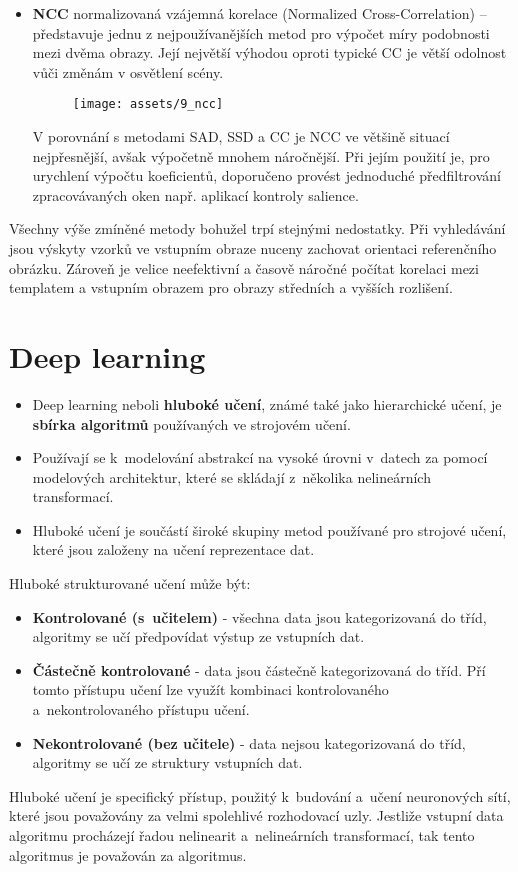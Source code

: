 \begin{itemize}
    \item \textbf{NCC} normalizovaná vzájemná korelace (Normalized Cross-Correlation) -- představuje jednu z nejpoužívanějších metod pro výpočet míry podobnosti mezi dvěma obrazy. Její největší výhodou oproti typické CC je větší odolnost vůči změnám v osvětlení scény.
          \begin{figure}[H]
              \centering
              \texttt{[image: assets/9\_ncc]}
          \end{figure}
          V porovnání s metodami SAD, SSD a CC je NCC ve většině situací nejpřesnější, avšak výpočetně mnohem náročnější. Při jejím použití je, pro urychlení výpočtu koeficientů, doporučeno provést jednoduché předfiltrování zpracovávaných oken např. aplikací kontroly salience.
\end{itemize}

Všechny výše zmíněné metody bohužel trpí stejnými nedostatky. Při vyhledávání jsou výskyty vzorků ve vstupním obraze nuceny zachovat orientaci referenčního obrázku. Zároveň je velice neefektivní a časově náročné počítat korelaci mezi templatem a vstupním obrazem pro obrazy středních a vyšších rozlišení.

\section{Deep learning}
\begin{itemize}
    \item Deep learning neboli \textbf{hluboké učení}, známé také jako hierarchické učení, je \textbf{sbírka algoritmů} používaných ve strojovém učení.
    \item Používají se k~modelování abstrakcí na vysoké úrovni v~datech za pomocí modelových architektur, které se skládají z~několika nelineárních transformací.
    \item Hluboké učení je součástí široké skupiny metod používané pro strojové učení, které jsou založeny na učení reprezentace dat.
\end{itemize}
Hluboké strukturované učení může být:
\begin{itemize}
    \item{\textbf{Kontrolované (s~učitelem)} - všechna data jsou kategorizovaná do tříd, algoritmy se učí předpovídat výstup ze vstupních dat.}
    \item{\textbf{Částečně kontrolované} - data jsou částečně kategorizovaná do tříd. Pří tomto přístupu učení lze využít kombinaci kontrolovaného a~nekontrolovaného přístupu učení.}
    \item{\textbf{Nekontrolované (bez učitele)} - data nejsou kategorizovaná do tříd, algoritmy se učí ze struktury vstupních dat.}
\end{itemize}
Hluboké učení je specifický přístup, použitý k~budování a~učení neuronových sítí, které jsou považovány za velmi spolehlivé rozhodovací uzly. Jestliže vstupní data algoritmu procházejí řadou nelinearit a~nelineárních transformací, tak tento algoritmus je považován za  algoritmus.

